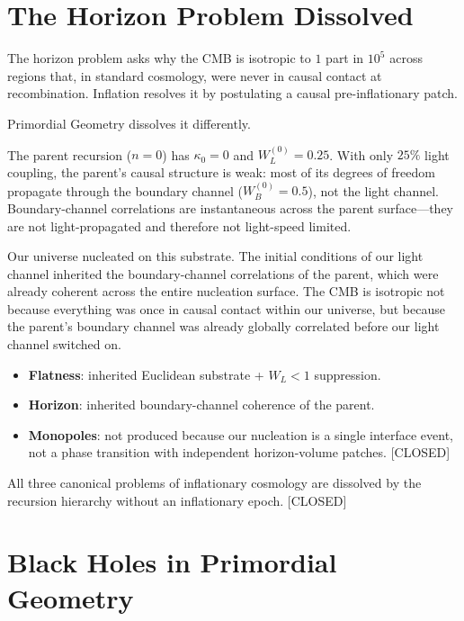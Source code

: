 \documentclass[prd,twocolumn,preprintnumbers,amsmath,amssymb]{revtex4-2}
\newcommand{\closed}{\textcolor{green!60!black}{[CLOSED]}}
\newcommand{\WL}{W_{L}}
\newcommand{\WB}{W_{B}}
\begin{document}
\section{The Horizon Problem Dissolved}
\label{sec:horizon}

The horizon problem asks why the CMB is isotropic to $1$ part in $10^5$ across
regions that, in standard cosmology, were never in causal contact at
recombination.  Inflation resolves it by postulating a causal pre-inflationary
patch.

Primordial Geometry dissolves it differently.

The parent recursion ($n=0$) has $\kappa_0 = 0$ and $\WL^{(0)} = 0.25$.
With only $25\%$ light coupling, the parent's causal structure is weak: most
of its degrees of freedom propagate through the boundary channel ($\WB^{(0)} =
0.5$), not the light channel.  Boundary-channel correlations are instantaneous
across the parent surface---they are not light-propagated and therefore not
light-speed limited.

Our universe nucleated on this substrate.  The initial conditions of our light
channel inherited the boundary-channel correlations of the parent, which were
already coherent across the entire nucleation surface.  The CMB is isotropic
not because everything was once in causal contact within our universe, but
because the parent's boundary channel was already globally correlated before
our light channel switched on.

\begin{itemize}
  \item \textbf{Flatness}: inherited Euclidean substrate + $\WL<1$ suppression.
  \item \textbf{Horizon}: inherited boundary-channel coherence of the parent.
  \item \textbf{Monopoles}: not produced because our nucleation is a single
        interface event, not a phase transition with independent horizon-volume
        patches. \closed
\end{itemize}

All three canonical problems of inflationary cosmology are dissolved by the
recursion hierarchy without an inflationary epoch.  \closed

\section{Black Holes in Primordial Geometry}
\label{sec:bh}
\end{document}
